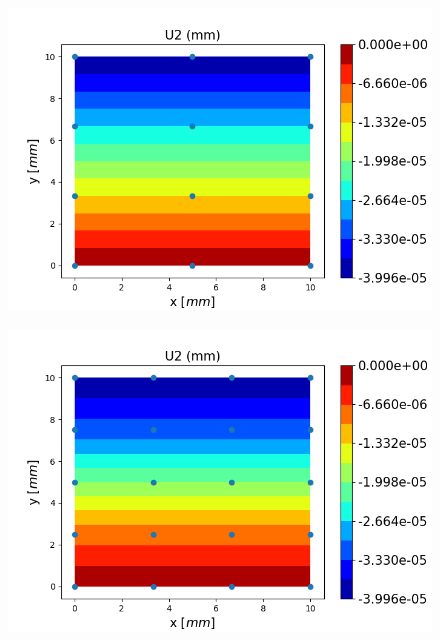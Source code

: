 \documentclass[12pt]{article}
\begin{document}
\begin{figure}[H]
	\centering
	\begin{minipage}{.5\textwidth}
		\centering
		\includegraphics[width=1\linewidth]{EM23U2_IGA.png}
		\label{EM23U2_IGA_1}
	\end{minipage}%
	\begin{minipage}{.5\textwidth}
		\centering
		\includegraphics[width=1\linewidth]{HEM12U2_IGA.png}
		\label{HEM12U2_IGA}
	\end{minipage}
\end{figure}
\end{document}
